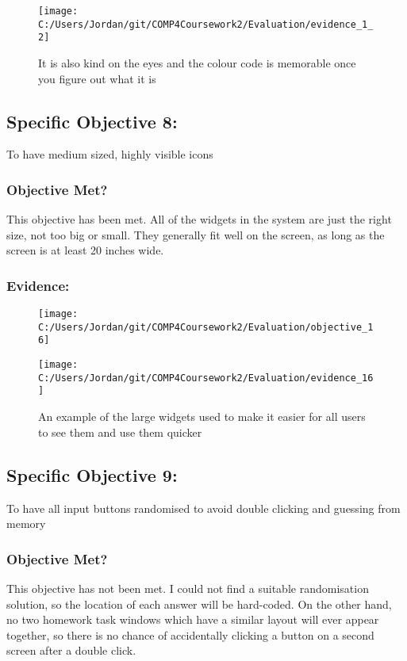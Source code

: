 \begin{figure}[H]
	\texttt{[image: C:/Users/Jordan/git/COMP4Coursework2/Evaluation/evidence\_1\_2]}
	\caption{It is also kind on the eyes and the colour code is memorable once you figure out what it is}
\end{figure}

\subsection{Specific Objective 8: }

To have medium sized, highly visible icons

\subsubsection{Objective Met?}

This objective has been met. All of the widgets in the system are just the right size, not too big or small. They generally fit well on the screen, as long as the screen is at least 20 inches wide.

\subsubsection{Evidence: }

\begin{figure}[H]
	\texttt{[image: C:/Users/Jordan/git/COMP4Coursework2/Evaluation/objective\_16]}
\end{figure}

\begin{figure}[H]
	\texttt{[image: C:/Users/Jordan/git/COMP4Coursework2/Evaluation/evidence\_16]}
	\caption{An example of the large widgets used to make it easier for all users to see them and use them quicker}
\end{figure}

\subsection{Specific Objective 9: }

To have all input buttons randomised to avoid double clicking and guessing from memory

\subsubsection{Objective Met?}

This objective has not been met. I could not find a suitable randomisation solution, so the location of each answer will be hard-coded. On the other hand, no two homework task windows which have a similar layout will ever appear together, so there is no chance of accidentally clicking a button on a second screen after a double click.

